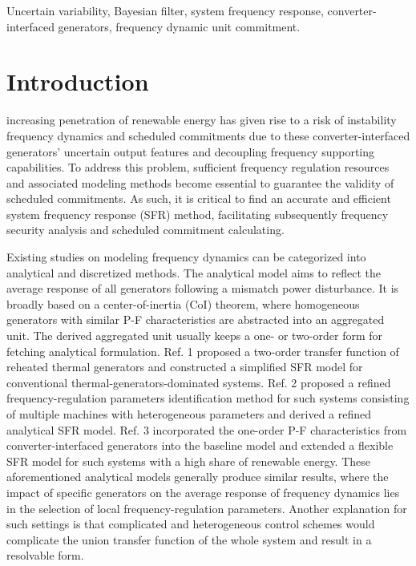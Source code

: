 \documentclass[lettersize,journal]{IEEEtran}
\begin{document}
\begin{IEEEkeywords}
	Uncertain variability, Bayesian filter, system frequency response, converter-interfaced generators, frequency dynamic unit commitment.
\end{IEEEkeywords}

\vspace{-0.12in}
{\selectfont
	\fontsize{9}{11}\selectfont
	\printnomenclature}
\vspace{-0.105in}

\section{Introduction}
 increasing penetration of renewable energy has given rise to a risk of instability frequency dynamics and scheduled commitments due to these converter-interfaced generators' uncertain output features and decoupling frequency supporting capabilities. To address this problem, sufficient frequency regulation resources and associated modeling methods become essential to guarantee the validity of scheduled commitments. As such, it is critical to find an accurate and efficient system frequency response (SFR) method, facilitating subsequently frequency security analysis and scheduled commitment calculating.

Existing studies on modeling frequency dynamics can be categorized into analytical and discretized methods. The analytical model aims to reflect the average response of all generators following a mismatch power disturbance. It is broadly based on a center-of-inertia (CoI) theorem, where homogeneous generators with similar P-F characteristics are abstracted into an aggregated unit. The derived aggregated unit usually keeps a one- or two-order form for fetching analytical formulation. Ref. 1 proposed a two-order transfer function of reheated thermal generators and constructed a simplified SFR model for conventional thermal-generators-dominated systems. Ref. 2 proposed a refined frequency-regulation parameters identification method for such systems consisting of multiple machines with heterogeneous parameters and derived a refined analytical SFR model. Ref. 3 incorporated the one-order P-F characteristics from converter-interfaced generators into the baseline model and extended a flexible SFR model for such systems with a high share of renewable energy. These aforementioned analytical models generally produce similar results, where the impact of specific generators on the average response of frequency dynamics lies in the selection of local frequency-regulation parameters. Another explanation for such settings is that complicated and heterogeneous control schemes would complicate the union transfer function of the whole system and result in a resolvable form.
\end{document}
